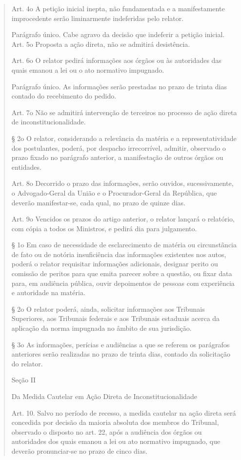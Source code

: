 \documentclass{article}
\begin{document}
\begin{quote}
Art. 4o A petição inicial inepta, não fundamentada e a manifestamente improcedente serão liminarmente indeferidas pelo relator.

Parágrafo único. Cabe agravo da decisão que indeferir a petição inicial. Art. 5o Proposta a ação direta, não se admitirá desistência.

Art. 6o O relator pedirá informações aos órgãos ou às autoridades das quais emanou a lei ou o ato normativo impugnado.

Parágrafo único. As informações serão prestadas no prazo de trinta dias contado do recebimento do pedido.

Art. 7o Não se admitirá intervenção de terceiros no processo de ação direta de inconstitucionalidade.

§ 2o O relator, considerando a relevância da matéria e a representatividade dos postulantes, poderá, por despacho irrecorrível, admitir, observado o prazo fixado no parágrafo anterior, a manifestação de outros órgãos ou entidades.

Art. 8o Decorrido o prazo das informações, serão ouvidos, sucessivamente, o Advogado-Geral da União e o Procurador-Geral da República, que deverão manifestar-se, cada qual, no prazo de quinze dias.

Art. 9o Vencidos os prazos do artigo anterior, o relator lançará o relatório, com cópia a todos os Ministros, e pedirá dia para julgamento.

§ 1o Em caso de necessidade de esclarecimento de matéria ou circunstância de fato ou de notória insuficiência das informações existentes nos autos, poderá o relator requisitar informações adicionais, designar perito ou comissão de peritos para que emita parecer sobre a questão, ou fixar data para, em audiência pública, ouvir depoimentos de pessoas com experiência e autoridade na matéria.

§ 2o O relator poderá, ainda, solicitar informações aos Tribunais Superiores, aos Tribunais federais e aos Tribunais estaduais acerca da aplicação da norma impugnada no âmbito de sua jurisdição.

§ 3o As informações, perícias e audiências a que se referem os parágrafos anteriores serão realizadas no prazo de trinta dias, contado da solicitação do relator.

Seção II

Da Medida Cautelar em Ação Direta de Inconstitucionalidade

Art. 10. Salvo no período de recesso, a medida cautelar na ação direta será concedida por decisão da maioria absoluta dos membros do Tribunal, observado o disposto no art. 22, após a audiência dos órgãos ou autoridades dos quais emanou a lei ou ato normativo impugnado, que deverão pronunciar-se no prazo de cinco dias.


\end{quote}
\end{document}

